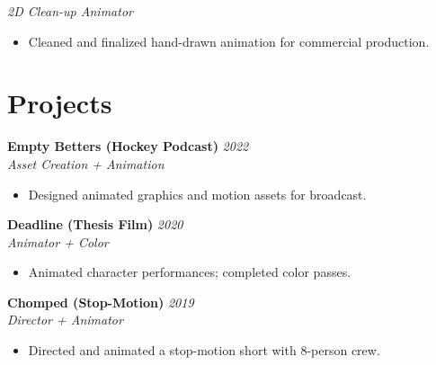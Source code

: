 \documentclass[11pt,letterpaper]{article}
\begin{document}
\textit{2D Clean-up Animator}

\begin{itemize}

    \item Cleaned and finalized hand-drawn animation for commercial production.

\end{itemize}




\section{Projects}



\textbf{Empty Betters (Hockey Podcast)} \hfill \textit{2022}\\

\textit{Asset Creation + Animation}

\begin{itemize}

    \item Designed animated graphics and motion assets for broadcast.

\end{itemize}



\textbf{Deadline (Thesis Film)} \hfill \textit{2020}\\

\textit{Animator + Color}

\begin{itemize}

    \item Animated character performances; completed color passes.

\end{itemize}



\textbf{Chomped (Stop-Motion)} \hfill \textit{2019}\\

\textit{Director + Animator}

\begin{itemize}

    \item Directed and animated a stop-motion short with 8-person crew.

\end{itemize}
\end{document}

